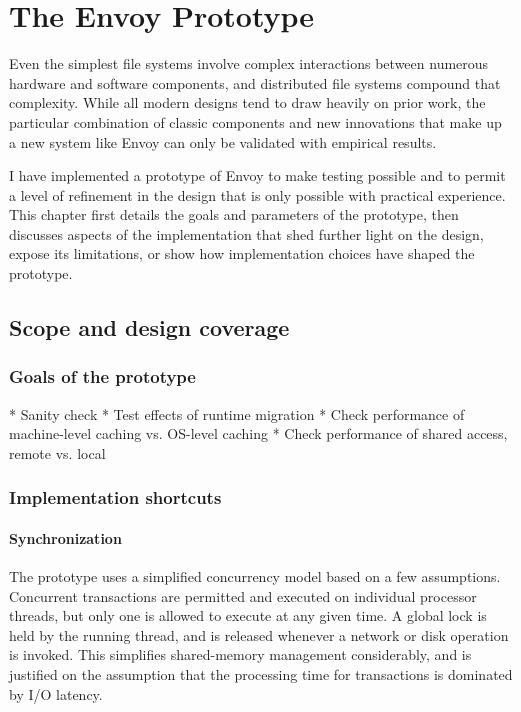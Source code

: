 \chapter{The Envoy Prototype}

Even the simplest file systems involve complex interactions between numerous hardware and software components, and distributed file systems compound that complexity. While all modern designs tend to draw heavily on prior work, the particular combination of classic components and new innovations that make up a new system like Envoy can only be validated with empirical results.

I have implemented a prototype of Envoy to make testing possible and to permit a level of refinement in the design that is only possible with practical experience. This chapter first details the goals and parameters of the prototype, then discusses aspects of the implementation that shed further light on the design, expose its limitations, or show how implementation choices have shaped the prototype.

\section{Scope and design coverage}

\subsection{Goals of the prototype}

* Sanity check
* Test effects of runtime migration
* Check performance of machine-level caching vs. OS-level caching
* Check performance of shared access, remote vs. local

\subsection{Implementation shortcuts}

\subsubsection{Synchronization}

The prototype uses a simplified concurrency model based on a few assumptions. Concurrent transactions are permitted and executed on individual processor threads, but only one is allowed to execute at any given time. A global lock is held by the running thread, and is released whenever a network or disk operation is invoked. This simplifies shared-memory management considerably, and is justified on the assumption that the processing time for transactions is dominated by I/O latency.

